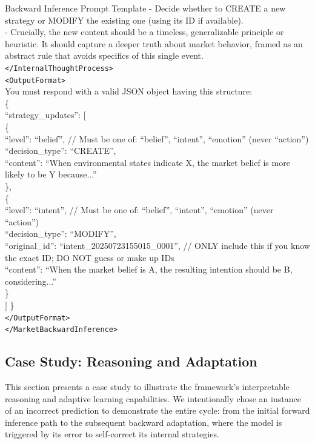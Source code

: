 \documentclass[letterpaper]{article} %
\begin{document}
\begin{promptbox}{Backward Inference Prompt Template}
     - Decide whether to CREATE a new strategy or MODIFY the existing one (using its ID if available). \\
     - Crucially, the new content should be a timeless, generalizable principle or heuristic. It should capture a deeper truth about market behavior, framed as an abstract rule that avoids specifics of this single event. \\
  \verb|</InternalThoughtProcess>| \\
  \verb|<OutputFormat>| \\
    You must respond with a valid JSON object having this structure: \\
    \{ \\
      ``strategy\_updates'': $[$ \\
        \{ \\
          ``level'': ``belief'', // Must be one of: ``belief'', ``intent'', ``emotion'' (never ``action'') \\
          ``decision\_type'': ``CREATE'', \\
          ``content'': ``When environmental states indicate X, the market belief is more likely to be Y because...'' \\
        \}, \\
        \{ \\
          ``level'': ``intent'', // Must be one of: ``belief'', ``intent'', ``emotion'' (never ``action'') \\ 
          ``decision\_type'': ``MODIFY'', \\
          ``original\_id'': ``intent\_20250723155015\_0001'', // ONLY include this if you know the exact ID; DO NOT guess or make up IDs \\
          ``content'': ``When the market belief is A, the resulting intention should be B, considering...'' \\
        \} \\
      $]$
    \} \\
  \verb|</OutputFormat>| \\
\verb|</MarketBackwardInference>| \\
\end{promptbox}


\subsection{Case Study: Reasoning and Adaptation}
\label{sec:case_study}
This section presents a case study to illustrate the framework's interpretable reasoning and adaptive learning capabilities. We intentionally chose an instance of an incorrect prediction to demonstrate the entire cycle: from the initial forward inference path to the subsequent backward adaptation, where the model is triggered by its error to self-correct its internal strategies.
\end{document}

